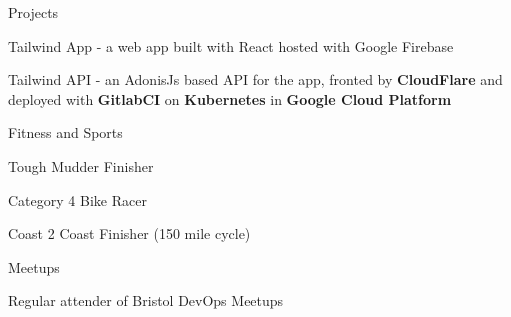 

\begin{cventries}

  \cventry
  {Projects} %
  {} %
  {} %
  {} %
  {
    \begin{cvitems} %
      \item {Tailwind App - a web app built with React hosted with Google Firebase}
      \item {Tailwind API - an AdonisJs based API for the app, fronted by \textbf{CloudFlare} and deployed with \textbf{GitlabCI} on \textbf{Kubernetes} in \textbf{Google Cloud Platform}}
    \end{cvitems}
  }
  \cventry
    {Fitness and Sports} %
    {} %
    {} %
    {} %
    {
      \begin{cvitems} %
        \item {Tough Mudder Finisher}
        \item {Category 4 Bike Racer}
        \item {Coast 2 Coast Finisher (150 mile cycle)}
      \end{cvitems}
    }

  \cventry
    {Meetups} %
    {} %
    {} %
    {} %
    {
      \begin{cvitems} %
        \item {Regular attender of Bristol DevOps Meetups}
      \end{cvitems}
    }

\end{cventries}

